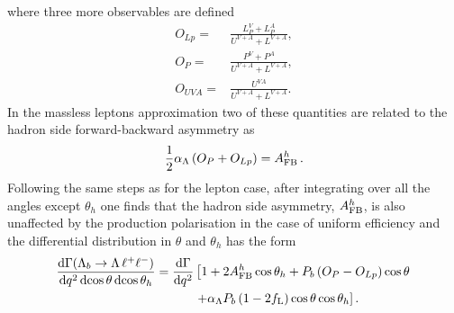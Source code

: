where three more observables are defined
\begin{align}
O_{Lp}=&\frac{L_P^{V}+L_P^{A}}{U^{V+A}+L^{V+A}}, \nonumber \\
O_P=&\frac{P^{V}+P^{A}}{U^{V+A}+L^{V+A}}, \nonumber \\
O_{UVA}=&\frac{U^{VA}}{U^{V+A}+L^{V+A}}. \nonumber
\end{align}
%
In the massless leptons approximation two of these quantities are related to the hadron side
forward-backward asymmetry as
\begin{equation}
\frac{1}{2}\alpha_\Lambda \left(O_P+O_{Lp}\right)=A_{\rm FB}^h\,.
\end{equation}
%
Following the same steps as for the lepton case, after integrating over all the angles except $\theta_h$ one finds
that the hadron side asymmetry, $A_{\rm FB}^h$, is also unaffected by the production polarisation in the case of uniform
efficiency and the differential distribution in $\theta$ and $\theta_h$ has the form
\begin{align}
\frac{\mathrm{d}\Gamma(\Lambda_{b}\rightarrow \Lambda \,\ell^{+}\ell^{-})}{\mathrm{d}q^2\,\mathrm{d}\!\cos\theta\,\mathrm{d}\!\cos\theta_h}=
\frac{\mathrm{d}\Gamma}{\mathrm{d}q^2}&\left[1+2A_{\rm FB}^h\cos\theta_h+P_b\left(O_P-O_{Lp}\right)\cos\theta\right.\nonumber \\
&\left.+\alpha_\Lambda P_b\left(1-2f_{\rm L}\right)\cos\theta\cos\theta_h\right].
\label{eq:hadron2D}
\end{align}

